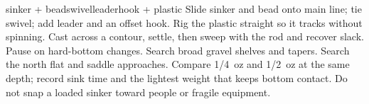 
{{sinker + bead}{swivel}{leader}{hook + plastic}}
{Slide sinker and bead onto main line; tie swivel; add leader and an
offset hook. Rig the plastic straight so it tracks without spinning.}
{Cast across a contour, settle, then sweep with the rod and recover slack.
Pause on hard-bottom changes.}
{Search broad gravel shelves and tapers.}
{Search the north flat and saddle approaches.}
{Compare \qty{1/4}{oz} and \qty{1/2}{oz} at the same depth; record sink time
and the lightest weight that keeps bottom contact.}
{Do not snap a loaded sinker toward people or fragile equipment.}
